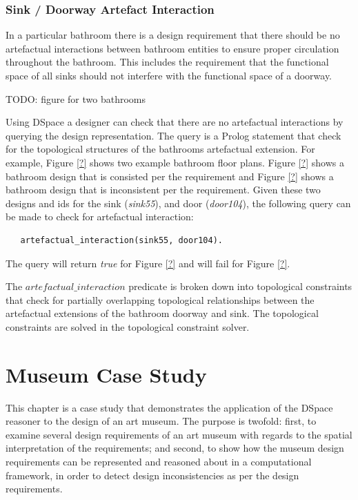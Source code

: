 \documentclass[12pt]{ucthesis}
\begin{document}
\subsection{Sink / Doorway Artefact Interaction}
In a particular bathroom there is a design requirement that there should be no artefactual interactions between bathroom entities to ensure proper circulation throughout the bathroom. This includes the requirement that the functional space of all sinks should not interfere with the functional space of a doorway. 

TODO: figure for two bathrooms

Using DSpace a designer can check that there are no artefactual interactions by querying the design representation. The query is a Prolog statement that check for the topological structures of the bathrooms artefactual extension. For example, Figure \ref{?} shows two example bathroom floor plans. Figure \ref{?} shows a bathroom design that is consisted per the requirement and Figure \ref{?} shows a bathroom design that is inconsistent per the requirement. Given these two designs and ids for the sink (\emph{sink55}), and door (\emph{door104}), the following query can be made to check for artefactual interaction:
\begin{verbatim}
   artefactual_interaction(sink55, door104).
\end{verbatim}
The query will return \emph{true} for Figure \ref{?} and will fail for Figure \ref{?}.

The $artefactual\_interaction$ predicate is broken down into topological constraints that check for partially overlapping topological relationships between the artefactual extensions of the bathroom doorway and sink. The topological constraints are solved in the topological constraint solver. 



\chapter{Museum Case Study}
This chapter is a case study that demonstrates the application of the DSpace reasoner to the design of an art museum. The purpose is twofold: first, to examine several design requirements of an art museum with regards to the spatial interpretation of the requirements; and second, to show how the museum design requirements can be represented and reasoned about in a computational framework, in order to detect design inconsistencies as per the design requirements.
\end{document}
